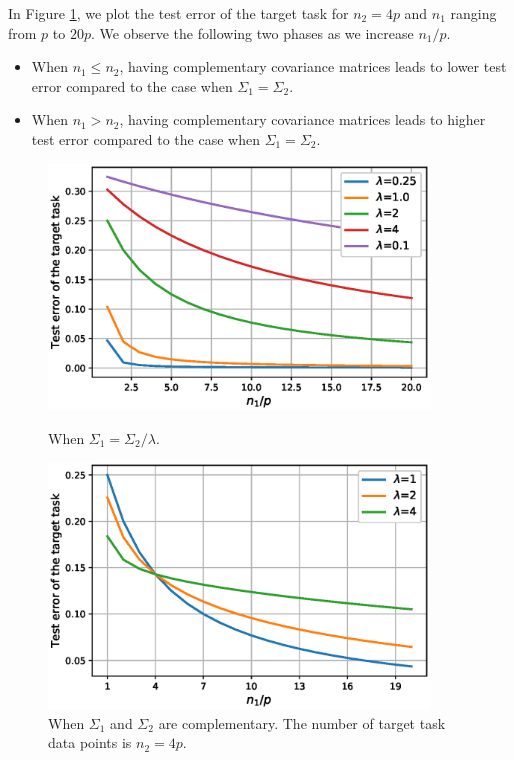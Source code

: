 In Figure \ref{fig_te_complement}, we plot the test error of the target task for $n_2 = 4p$ and $n_1$ ranging from $p$ to $20p$.
We observe the following two phases as we increase $n_1 / p$.
\begin{itemize}
	\item When $n_1 \le n_2$, having complementary covariance matrices leads to lower test error compared to the case when $\Sigma_1 = \Sigma_2$.
	\item When $n_1 > n_2$, having complementary covariance matrices leads to higher test error compared to the case when $\Sigma_1 = \Sigma_2$.
\end{itemize}

\begin{figure}
	\centering
	\begin{minipage}{0.48\textwidth}
		\centering
		\includegraphics[width=0.9\textwidth]{figures/scaling.eps}
		\caption{When $\Sigma_1 = \Sigma_2 / \lambda$.}
		\label{fig_te_scaling}
	\end{minipage}\hfill
	\begin{minipage}{0.48\textwidth}
		\centering
		\includegraphics[width=0.9\textwidth]{figures/complementary.eps}
		\caption{When $\Sigma_1$ and $\Sigma_2$ are complementary. The number of target task data points is $n_2 = 4p$.}
		\label{fig_te_complement}
	\end{minipage}
\end{figure}


